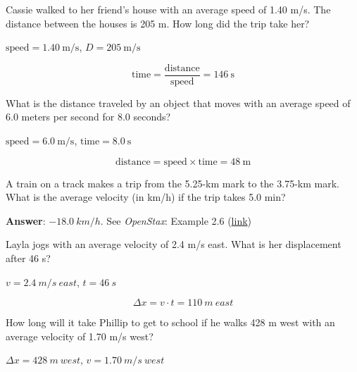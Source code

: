 \documentclass[addpoints]{exam}
\begin{document}
\begin{questions}
\question
Cassie walked to her friend’s house with an average speed of 1.40 m/s. The distance between the houses is 205 m. How long did the trip take her?

\begin{solution}
    $\text{speed} = \SI{1.40}{\meter/\second}$, $D = \SI{205}{\meter/\second}$

\begin{equation*}
    \text{time} = \frac{\text{distance}}{\text{speed}} = \SI{146}{\second}
\end{equation*}
\end{solution}

\question
What is the distance traveled by an object that moves with an average speed of 6.0 meters per second for 8.0 seconds?

\begin{solution}
    $\text{speed} = \SI{6.0}{\meter/\second}$, $\text{time} = \SI{8.0}{\second}$

\begin{equation*}
    \text{distance} = \text{speed} \times \text{time} = \SI{48}{\meter} 
\end{equation*}
\end{solution}


\question
A train on a track makes a trip from the 5.25-km mark to the 3.75-km mark. What is the average velocity (in km/h) if the trip takes 5.0 min?

\begin{solution}
    \textbf{Answer}: $\SI{-18.0}{km/h}$. See \textit{OpenStax}: Example 2.6 (\href{https://openstax.org/books/college-physics/pages/2-4-acceleration}{link})
\end{solution}

\question
Layla jogs with an average velocity of 2.4 m/s east. What is her displacement after 46 s?

\begin{solution}
    $v = \SI{2.4}{m/s\ east}$, $t = \SI{46}{s}$

\begin{equation*}
    \Delta{x} = v \cdot t = \SI{110}{m\ east}
\end{equation*}
\end{solution}


\question
How long will it take Phillip to get to school if he walks 428 m west with an average velocity of 1.70 m/s west?

\begin{solution}
    $\Delta{x} = \SI{428}{m\ west}$, $v = \SI{1.70}{m/s\ west}$


\end{solution}
\end{questions}
\end{document}
